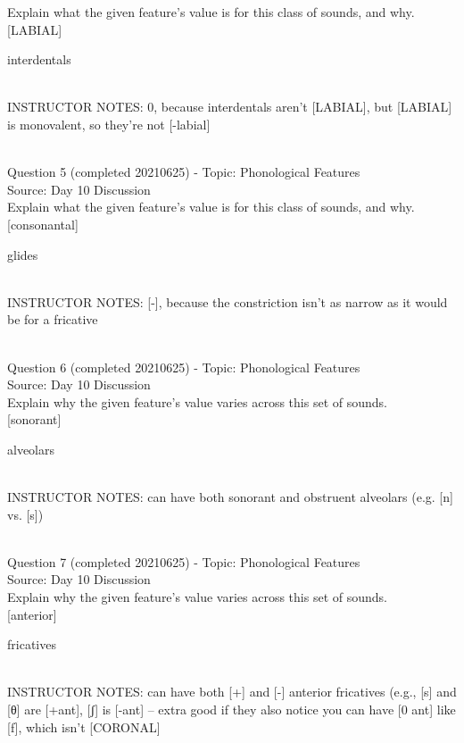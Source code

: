 \documentclass[12pt]{article}
\begin{document}
Explain what the given feature’s value is for this class of sounds, and why.\\

{[LABIAL]}

interdentals


~\\
INSTRUCTOR NOTES: 0, because interdentals aren't [LABIAL], but [LABIAL] is monovalent, so they're not [-labial]


~\\

{\large Question 5} (completed 20210625) - Topic: Phonological Features\\
Source: Day 10 Discussion\\

Explain what the given feature’s value is for this class of sounds, and why.\\

{[consonantal]}

glides


~\\
INSTRUCTOR NOTES: [-], because the constriction isn't as narrow as it would be for a fricative


~\\

{\large Question 6} (completed 20210625) - Topic: Phonological Features\\
Source: Day 10 Discussion\\

Explain why the given feature's value varies across this set of sounds.\\

{[sonorant]}

alveolars


~\\
INSTRUCTOR NOTES: can have both sonorant and obstruent alveolars (e.g. [n] vs. [s])


~\\

{\large Question 7} (completed 20210625) - Topic: Phonological Features\\
Source: Day 10 Discussion\\

Explain why the given feature's value varies across this set of sounds.\\

{[anterior]}

fricatives


~\\
INSTRUCTOR NOTES: can have both [+] and [-] anterior fricatives (e.g., [s] and [θ] are [+ant], [ʃ] is [-ant] -- extra good if they also notice you can have [0 ant] like [f], which isn't [CORONAL]
\end{document}
